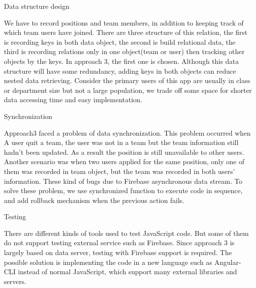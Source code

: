 \documentclass[conference]{IEEEtran}
\begin{document}
Data structure design

We have to record positions and team members, in addition to keeping track of which team users have joined. There are three structure of this relation, the first is recording keys in both data object, the second is build relational data, the third is recording relations only in one object(team or user) then tracking other objects by the keys. In approach 3, the first one is chosen. Although this data structure will have some redundancy, adding keys in both objects can reduce nested data retrieving. Consider the primary users of this app are usually in class or department size but not a large population, we trade off some space for shorter data accessing time and easy implementation.

Synchronization

Approach3 faced a problem of data synchronization. This problem occurred when A user quit a team, the user was not in a team but the team information still hadn't been updated. As a result the position is still unavailable to other users. Another scenario was when two users applied for the same position, only one of them was recorded in team object, but the team was recorded in both users' information. These kind of bugs due to Firebase asynchronous data stream. To solve these problem, we use synchronized function to execute code in sequence, and add rollback mechanism when the previous action fails.

Testing

There are different kinds of tools used to test JavaScript code. But some of them do not support testing external service such as Firebase. Since approach 3 is largely based on data server, testing with Firebase support is required. The possible solution is implementing the code in a new language such as Angular-CLI instead of normal JavaScript, which support many external libraries and servers.
\end{document}
